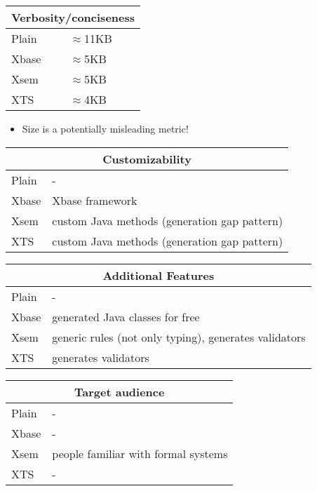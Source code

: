 \begin{frame}
\framebreak
\begin{tabularx}{\linewidth}{ l   X }
\multicolumn{2}{c}{Verbosity/conciseness} \\ \hline
Plain & $\approx$11KB \\%
Xbase &$\approx$5KB \\%
Xsem & $\approx$5KB \\%
XTS & $\approx$4KB \\%
\end{tabularx}

\begin{itemize}
  \item Size is a potentially misleading metric! 
\end{itemize}


\framebreak
\begin{tabularx}{\linewidth}{ l   X }
\multicolumn{2}{c}{Customizability} \\ \hline
Plain & - \\
Xbase & Xbase framework \\
Xsem & custom Java methods (generation gap pattern)\\
XTS & custom Java methods (generation gap pattern) \\
\end{tabularx}

\framebreak
\begin{tabularx}{\linewidth}{ l   X }
\multicolumn{2}{c}{Additional Features} \\ \hline
Plain & - \\
Xbase & generated Java classes for free \\
Xsem & generic rules (not only typing), generates validators \\
XTS & generates validators \\
\end{tabularx}

\framebreak
\begin{tabularx}{\linewidth}{ l   X }
\multicolumn{2}{c}{Target audience} \\ \hline
Plain & - \\
Xbase & - \\
Xsem & people familiar with formal systems \\
XTS & - \\
\end{tabularx}


\end{frame}
